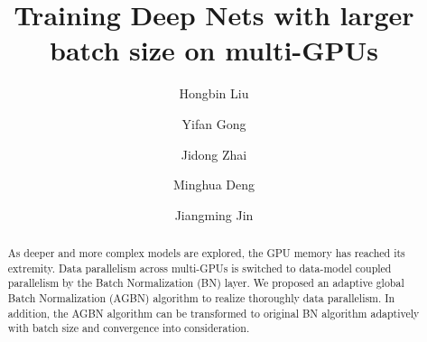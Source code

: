 \documentclass[sigconf]{acmart}
\begin{document}
\title{Training Deep Nets with larger batch size on multi-GPUs}


\author{Hongbin Liu}

\author{Yifan Gong}

\author{Jidong Zhai}

\author{Minghua Deng}

\author{Jiangming Jin}

\renewcommand{\shortauthors}{Hongbin Liu et al.}


\begin{abstract}

As deeper and more complex models are explored, the GPU memory has reached its extremity. Data parallelism across multi-GPUs is switched to data-model coupled parallelism by the Batch Normalization (BN) layer. We proposed an adaptive global Batch Normalization (AGBN) algorithm to realize thoroughly data parallelism. In addition, the AGBN algorithm can be transformed to original BN algorithm adaptively with batch size and convergence into consideration.

\end{abstract}
\end{document}
